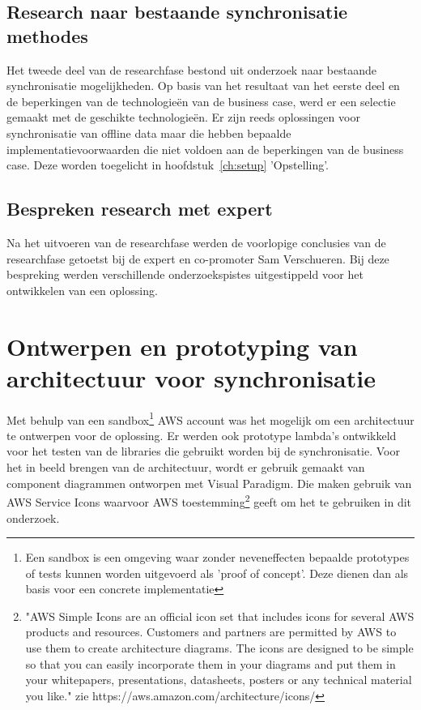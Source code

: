 \subsection{Research naar bestaande synchronisatie methodes}
Het tweede deel van de researchfase bestond uit onderzoek naar bestaande synchronisatie mogelijkheden. Op basis van het resultaat van het eerste deel en de beperkingen van de technologie\"en van de business case, werd er een selectie gemaakt met de geschikte technologie\"en. Er zijn reeds oplossingen voor synchronisatie van offline data maar die hebben bepaalde implementatievoorwaarden die niet voldoen aan de beperkingen van de business case. Deze worden toegelicht in hoofdstuk~\ref{ch:setup} 'Opstelling'.
\subsection{Bespreken research met expert}
Na het uitvoeren van de researchfase werden de voorlopige conclusies van de researchfase getoetst bij de expert en co-promoter Sam Verschueren. Bij deze bespreking werden verschillende onderzoekspistes uitgestippeld voor het ontwikkelen van een oplossing.
\section{Ontwerpen en prototyping van architectuur voor synchronisatie}
Met behulp van een sandbox\footnote{Een sandbox is een omgeving waar zonder neveneffecten bepaalde prototypes of tests kunnen worden uitgevoerd als 'proof of concept'. Deze dienen dan als basis voor een concrete implementatie} AWS account was het mogelijk om een architectuur te ontwerpen voor de oplossing. Er werden ook prototype lambda's ontwikkeld voor het testen van de libraries die gebruikt worden bij de synchronisatie. Voor het in beeld brengen van de architectuur, wordt er gebruik gemaakt van component diagrammen ontworpen met Visual Paradigm. Die maken gebruik van AWS Service Icons waarvoor AWS toestemming\footnote{"AWS Simple Icons are an official icon set that includes icons for several AWS products and resources. Customers and partners are permitted by AWS to use them to create architecture diagrams. The icons are designed to be simple so that you can easily incorporate them in your diagrams and put them in your whitepapers, presentations, datasheets, posters or any technical material you like." zie https://aws.amazon.com/architecture/icons/ } geeft om het te gebruiken in dit onderzoek.
\clearpage
